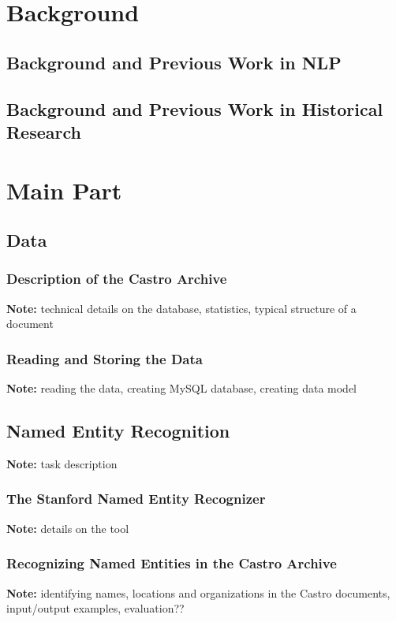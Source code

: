 \documentclass[11pt]{article}
\newcommand{\note}[1]{{\textbf{Note:} \color{blue} #1}}
\begin{document}

\section{Background} %
\label{sec:background}


\subsection {Background and Previous Work in NLP}
\subsection {Background and Previous Work in Historical Research}


\section{Main Part} %
\label{sec:main_part}

	\subsection {Data}
		\subsubsection{Description of the Castro Archive}
		\note technical details on the database, statistics, typical structure of a document
		\subsubsection{Reading and Storing the Data}
		\note reading the data, creating MySQL database, creating data model
		
	\subsection {Named Entity Recognition}
	\note task description
  	\subsubsection{The Stanford Named Entity Recognizer}
		\note details on the tool
		\subsubsection{Recognizing Named Entities in the Castro Archive} 
		\note identifying names, locations and organizations in the Castro documents, input/output examples, evaluation??
			
\end{document}
